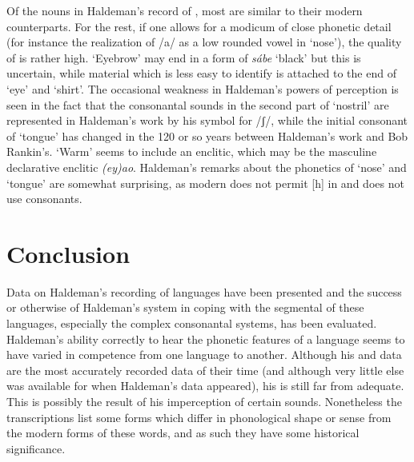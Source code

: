 \documentclass[output=paper]{LSP/langsci}
\begin{document}
Of the nouns in Haldeman's record of , most are similar to their modern counterparts.  For the rest, if one allows for a modicum of close phonetic detail (for instance the realization of /a/ as a low rounded vowel in `nose'), the quality of  is rather high. `Eyebrow' may end in a form of \textit{s\'abe} `black' but this is uncertain, while material which is less easy to identify is attached to the end of `eye' and `shirt'.  The occasional weakness in Haldeman's powers of perception is seen in the fact that the consonantal sounds in the second part of `nostril' are represented in Haldeman's work by his symbol for /ʃ/, while the initial consonant of `tongue' has changed in the 120 or so years between Haldeman's work and Bob Rankin's.  `Warm' seems to include an enclitic, which may be the masculine declarative enclitic \textit{(ey)ao}.  Haldeman's remarks about the phonetics of `nose' and `tongue' are somewhat surprising, as modern  does not permit [h] in  and does not use  consonants.


\section{Conclusion}
 
Data on Haldeman's recording of  languages have been presented and the success or otherwise of Haldeman's system in coping with the segmental  of these languages, especially the complex consonantal systems, has been evaluated. Haldeman's ability correctly to hear the phonetic features of a language seems to have varied in competence from one language to another.  Although his  and  data are the most accurately recorded  data of their time (and although very little else was available for  when Haldeman's data appeared), his  is still far from adequate.  This is possibly the result of his imperception of certain sounds.  Nonetheless the transcriptions list some forms which differ in phonological shape or sense from the modern forms of these words, and as such they have some historical significance. 
 
\end{document}
